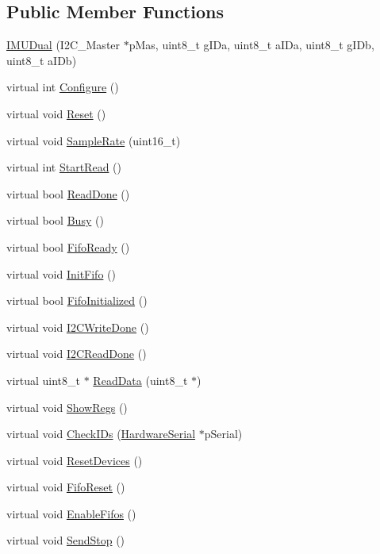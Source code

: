 \subsection*{Public Member Functions}
\begin{DoxyCompactItemize}
\item 
\hyperlink{class_i_m_u_dual_a2ed39a55c175fb30d7134e69ca52f843}{IMUDual} (I2C\_\-Master $\ast$pMas, uint8\_\-t gIDa, uint8\_\-t aIDa, uint8\_\-t gIDb, uint8\_\-t aIDb)
\item 
virtual int \hyperlink{class_i_m_u_dual_ae326dfce6b8c72be8a1b96fc3026433f}{Configure} ()
\item 
virtual void \hyperlink{class_i_m_u_dual_a16b0be8e87ddae48c0aff3f4a5163782}{Reset} ()
\item 
virtual void \hyperlink{class_i_m_u_dual_a3b8833e2319c7d9765d5e0fa8d3cad73}{SampleRate} (uint16\_\-t)
\item 
virtual int \hyperlink{class_i_m_u_dual_abebeced0d1a36d9d0b37a5dd02e76967}{StartRead} ()
\item 
virtual bool \hyperlink{class_i_m_u_dual_a12128daebec97b4c946cd29b784593c2}{ReadDone} ()
\item 
virtual bool \hyperlink{class_i_m_u_dual_ad36d7920ec4fbc369ee5327157f315f5}{Busy} ()
\item 
virtual bool \hyperlink{class_i_m_u_dual_a34fa8e7a4996a0857fed465744a2bbf6}{FifoReady} ()
\item 
virtual void \hyperlink{class_i_m_u_dual_afe0d19f1f62dfc9f293521323ef5ad69}{InitFifo} ()
\item 
virtual bool \hyperlink{class_i_m_u_dual_ac33359e3c7d79338c22c89571849c8eb}{FifoInitialized} ()
\item 
virtual void \hyperlink{class_i_m_u_dual_a7305a65feb3b8da6e835aaced51946a1}{I2CWriteDone} ()
\item 
virtual void \hyperlink{class_i_m_u_dual_a2ebf9da7dc74187623f4594c795b601f}{I2CReadDone} ()
\item 
virtual uint8\_\-t $\ast$ \hyperlink{class_i_m_u_dual_aec32a1b0299d51446d3dbfd3ef4c1da5}{ReadData} (uint8\_\-t $\ast$)
\item 
virtual void \hyperlink{class_i_m_u_dual_aed63de656cce83f805a9aa7a1ea81316}{ShowRegs} ()
\item 
virtual void \hyperlink{class_i_m_u_dual_a84d1495f1ddcaecedf0d63a18ca63e04}{CheckIDs} (\hyperlink{class_hardware_serial}{HardwareSerial} $\ast$pSerial)
\item 
virtual void \hyperlink{class_i_m_u_dual_a7116532b2c043e0ab6cf8637f10fe40a}{ResetDevices} ()
\item 
virtual void \hyperlink{class_i_m_u_dual_a8de7c76490e9e6dba85b89cdb1acbaae}{FifoReset} ()
\item 
virtual void \hyperlink{class_i_m_u_dual_ad80ad278357955e7c4f0c51f47c257e3}{EnableFifos} ()
\item 
virtual void \hyperlink{class_i_m_u_dual_aa706d010bb2b1f4f2d353feb24e1f77f}{SendStop} ()
\end{DoxyCompactItemize}
